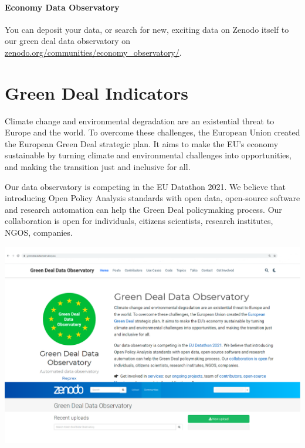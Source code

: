 \documentclass[
  a4paper,
  openany, a4paper, oneside]{book}
\begin{document}
\hypertarget{economy-data-observatory-1}{%
\subsubsection{Economy Data Observatory}\label{economy-data-observatory-1}}

You can deposit your data, or search for new, exciting data on Zenodo itself to our green deal data observatory on \href{https://zenodo.org/communities/economy_observatory?page=1\&size=20}{zenodo.org/communities/economy\_observatory/}.

\hypertarget{green-deal}{%
\chapter{Green Deal Indicators}\label{green-deal}}

Climate change and environmental degradation are an existential threat to Europe and the world. To overcome these challenges, the European Union created the European Green Deal strategic plan. It aims to make the EU's economy sustainable by turning climate and environmental challenges into opportunities, and making the transition just and inclusive for all.

Our data observatory is competing in the EU Datathon 2021. We believe that introducing Open Policy Analysis standards with open data, open-source software and research automation can help the Green Deal policymaking process. Our collaboration is open for individuals, citizens scientists, research institutes, NGOS, companies.

\begin{center}\includegraphics[width=26.32in]{plots/screenshots/greendeal_and_zenodo} \end{center}
\end{document}
